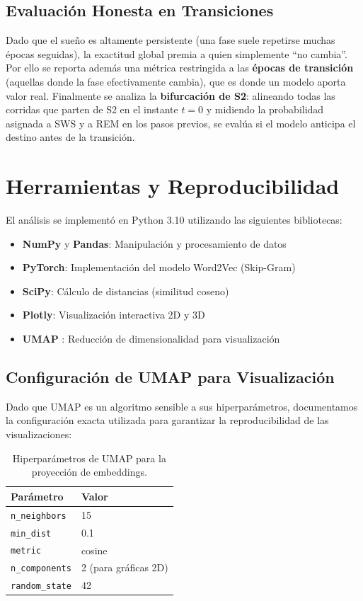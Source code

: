 \subsection{Evaluación Honesta en Transiciones}

Dado que el sueño es altamente persistente (una fase suele repetirse muchas épocas seguidas), la exactitud global premia a quien simplemente ``no cambia''. Por ello se reporta además una métrica restringida a las \textbf{épocas de transición} (aquellas donde la fase efectivamente cambia), que es donde un modelo aporta valor real. Finalmente se analiza la \textbf{bifurcación de S2}: alineando todas las corridas que parten de S2 en el instante $t=0$ y midiendo la probabilidad asignada a SWS y a REM en los pasos previos, se evalúa si el modelo anticipa el destino antes de la transición.

\section{Herramientas y Reproducibilidad}

El análisis se implementó en Python 3.10 utilizando las siguientes bibliotecas:
\begin{itemize}
    \item \textbf{NumPy} y \textbf{Pandas}: Manipulación y procesamiento de datos
    \item \textbf{PyTorch}: Implementación del modelo Word2Vec (Skip-Gram)
    \item \textbf{SciPy}: Cálculo de distancias (similitud coseno)
    \item \textbf{Plotly}: Visualización interactiva 2D y 3D
    \item \textbf{UMAP} \citep{mcinnes2018umap}: Reducción de dimensionalidad para visualización
\end{itemize}

\subsection{Configuración de UMAP para Visualización}

Dado que UMAP es un algoritmo sensible a sus hiperparámetros, documentamos la configuración exacta utilizada para garantizar la reproducibilidad de las visualizaciones:

\begin{table}[htbp]
\centering
\caption{Hiperparámetros de UMAP para la proyección de embeddings.}
\label{tab:hiperparametros_umap}
\begin{tabular}{ll}
\hline
\textbf{Parámetro} & \textbf{Valor} \\
\hline
\texttt{n\_neighbors} & 15 \\
\texttt{min\_dist} & 0.1 \\
\texttt{metric} & cosine \\
\texttt{n\_components} & 2 (para gráficas 2D) \\
\texttt{random\_state} & 42 \\
\hline
\end{tabular}
\end{table}

